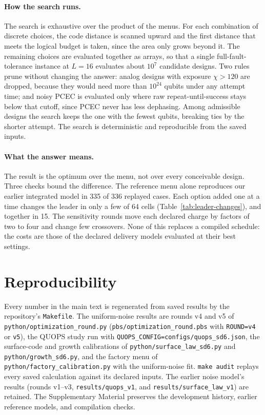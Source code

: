 \documentclass[11pt]{article}
\begin{document}
\paragraph{How the search runs.} The search is exhaustive over the product of the
menus. For each combination of discrete choices, the code distance is scanned
upward and the first distance that meets the logical budget is taken, since the
area only grows beyond it. The remaining choices are evaluated together as
arrays, so that a single full-fault-tolerance instance at $L=16$ evaluates about
$10^7$ candidate designs. Two rules prune without changing the answer: analog
designs with exposure $\chi>120$ are dropped, because they would need more than
$10^{24}$ qubits under any attempt time; and noisy PCEC is evaluated only where
raw repeat-until-success stays below that cutoff, since PCEC never has less
dephasing. Among admissible designs the search keeps the one with the fewest
qubits, breaking ties by the shorter attempt. The search is deterministic and
reproducible from the saved inputs.

\paragraph{What the answer means.} The result is the optimum over the menu, not
over every conceivable design. Three checks bound the difference. The reference
menu alone reproduces our earlier integrated model in 335 of 336 replayed cases.
Each option added one at a time changes the leader in only a few of 64 cells
(Table~\ref{tab:leader-changes}), and together in 15. The sensitivity rounds move
each declared charge by factors of two to four and change few crossovers. None of
this replaces a compiled schedule: the costs are those of the declared delivery
models evaluated at their best settings.

\section{Reproducibility}\label{app:reproducibility}
{\sloppy Every number in the main text is regenerated from saved results by the repository's \texttt{Makefile}. The uniform-noise results are rounds v4 and v5 of \texttt{python/optimization\_round.py} (\texttt{pbs/optimization\_round.pbs} with \texttt{ROUND=v4} or \texttt{v5}), the QUOPS study run with \texttt{QUOPS\_CONFIG=configs/quops\_sd6.json}, the surface-code and growth calibrations of \texttt{python/surface\_law\_sd6.py} and \texttt{python/growth\_sd6.py}, and the factory menu of \texttt{python/factory\_calibration.py} with the uniform-noise fit. \texttt{make audit} replays every saved calculation against its declared inputs. The earlier noise model's results (rounds v1--v3, \texttt{results/quops\_v1}, and \texttt{results/surface\_law\_v1}) are retained. The Supplementary Material preserves the development history, earlier reference models, and compilation checks.\par}



\end{document}
